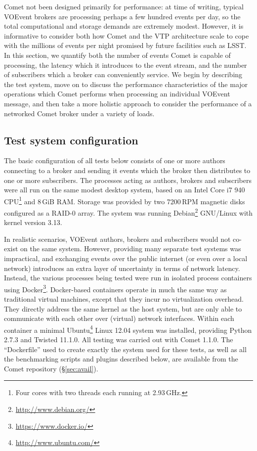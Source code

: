 \documentclass[5p,authoryear]{elsarticle}
\begin{document}
Comet not been designed primarily for performance: at time of writing, typical
VOEvent brokers are processing perhaps a few hundred events per day, so the
total computational and storage demands are extremely modest. However, it is
informative to consider both how Comet and the VTP architecture scale to cope
with the millions of events per night promised by future facilities such as
LSST\@. In this section, we quantify both the number of events Comet is
capable of processing, the latency which it introduces to the event stream,
and the number of subscribers which a broker can conveniently service. We
begin by describing the test system, move on to discuss the performance
characteristics of the major operations which Comet performs when processing
an individual VOEvent message, and then take a more holistic approach to
consider the performance of a networked Comet broker under a variety of loads.

\subsection{Test system configuration}
\label{sec:perf:system}

The basic configuration of all tests below consists of one or more authors
connecting to a broker and sending it events which the broker then distributes
to one or more subscribers. The processes acting as authors, brokers and
subscribers were all run on the same modest desktop system, based on an Intel
Core i7 940 CPU\footnote{Four cores with two threads each running at
2.93\,GHz.} and 8\,GiB RAM\@. Storage was provided by two 7200\,RPM magnetic
disks configured as a RAID-0 array. The system was running
Debian\footnote{\url{http://www.debian.org/}} GNU/Linux with kernel version
3.13.

In realistic scenarios, VOEvent authors, brokers and subscribers would not
co-exist on the same system. However, providing many separate test systems was
impractical, and exchanging events over the public internet (or even over a
local network) introduces an extra layer of uncertainty in terms of network
latency. Instead, the various processes being tested were run in isolated
process containers using Docker\footnote{\url{https://www.docker.io/}}.
Docker-based containers operate in much the same way as traditional virtual
machines, except that they incur no virtualization overhead. They directly
address the same kernel as the host system, but are only able to communicate
with each other over (virtual) network interfaces. Within each container a
minimal Ubuntu\footnote{\url{http://www.ubuntu.com/}} Linux 12.04 system was
installed, providing Python 2.7.3 and Twisted 11.1.0. All testing was carried
out with Comet 1.1.0. The ``Dockerfile'' used to create exactly the system
used for these tests, as well as all the benchmarking scripts and plugins
described below, are available from the Comet repository (\S\ref{sec:avail}).
\end{document}

